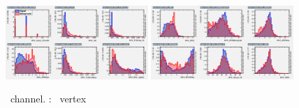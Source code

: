 \begin{figure}[htbp]
	\includegraphics[width=0.48\textwidth]{6_Search/Figures/MVAtechnics/toppairzct/eeu/variables_id_c1.png}
	\includegraphics[width=0.48\textwidth]{6_Search/Figures/MVAtechnics/toppairzct/eeu/variables_id_c2.png}
	\caption{\eemu\ channel. \TTSR: \Zct\ vertex }
	\label{image:Figureseeutoppairzct}
\end{figure}


